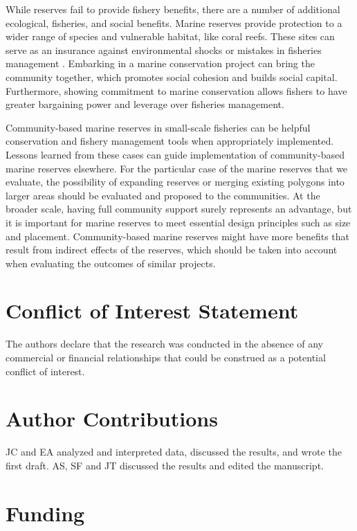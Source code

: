 \documentclass{frontiersSCNS}
\begin{document}
While reserves fail to provide fishery benefits, there are a number of
additional ecological, fisheries, and social benefits. Marine reserves
provide protection to a wider range of species and vulnerable habitat,
like coral reefs. These sites can serve as an insurance against
environmental shocks or mistakes in fisheries management
\citep{hilborn_2004,hilborn_2006,micheli_2012-EU}. Embarking in a marine
conservation project can bring the community together, which promotes
social cohesion and builds social capital. Furthermore, showing
commitment to marine conservation allows fishers to have greater
bargaining power and leverage over fisheries management.

Community-based marine reserves in small-scale fisheries can be helpful
conservation and fishery management tools when appropriately
implemented. Lessons learned from these cases can guide implementation
of community-based marine reserves elsewhere. For the particular case of
the marine reserves that we evaluate, the possibility of expanding
reserves or merging existing polygons into larger areas should be
evaluated and proposed to the communities. At the broader scale, having
full community support surely represents an advantage, but it is
important for marine reserves to meet essential design principles such
as size and placement. Community-based marine reserves might have more
benefits that result from indirect effects of the reserves, which should
be taken into account when evaluating the outcomes of similar projects.

\section*{Conflict of Interest Statement}

The authors declare that the research was conducted in the absence of
any commercial or financial relationships that could be construed as a
potential conflict of interest.

\section*{Author Contributions}

JC and EA analyzed and interpreted data, discussed the results, and
wrote the first draft. AS, SF and JT discussed the results and edited
the manuscript.

\section*{Funding}
\end{document}
